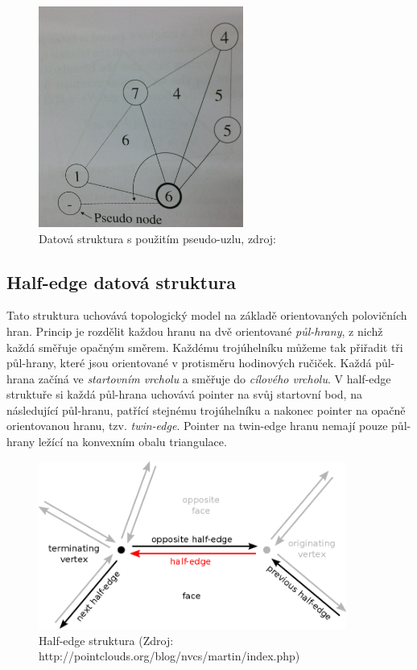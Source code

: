\documentclass[12pt,a4paper]{article}
\begin{document}
\begin{figure}[h!]
\centering
\includegraphics[width=0.6\textwidth, angle=90]{img/pseudo_node.jpg}
\caption{Datová struktura s použitím pseudo-uzlu, zdroj: \cite{triangulation}}
\label{fig:pseudo_node}
\end{figure}

\newpage
\subsection{Half-edge datová struktura}

Tato struktura uchovává topologický model na základě orientovaných polovičních hran. Princip je rozdělit každou hranu na dvě orientované \emph{půl-hrany}, z nichž každá směřuje opačným směrem. Každému trojúhelníku můžeme tak přiřadit tři půl-hrany, které jsou orientované v protisměru hodinových ručiček. Každá půl-hrana začíná ve \emph{startovním vrcholu} a směřuje do \emph{cílového vrcholu}. V half-edge struktuře si každá půl-hrana uchovává pointer na svůj startovní bod, na následující půl-hranu, patřící stejnému trojúhelníku a nakonec pointer na opačně orientovanou hranu, tzv. \emph{twin-edge}. Pointer na twin-edge hranu nemají pouze půl-hrany ležící na konvexním obalu triangulace.

\begin{figure}[h!]
\centering
\includegraphics[width=0.9\textwidth]{img/half_edge.png}
\caption{Half-edge struktura (Zdroj: http://pointclouds.org/blog/nvcs/martin/index.php)}
\label{fig:half_edge}
\end{figure}
\end{document}
